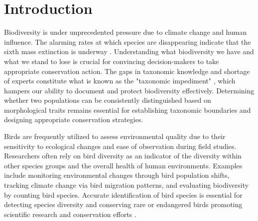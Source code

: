 \documentclass[a4paper,12pt]{report}
\begin{document}
\newpage
\tableofcontents

\newpage
\listoffigures

\newpage
\listoftables

\newpage
\cleardoublepage %
\setcounter{page}{1} %

\chapter{Introduction}

Biodiversity is under unprecedented pressure due to climate change and human influence. The alarming rates at which species are disappearing indicate that the sixth mass extinction is underway \citep{Ceballos2017}. Understanding what biodiversity we have and what we stand to lose is crucial for convincing decision-makers to take appropriate conservation action. The gaps in taxonomic knowledge and shortage of experts constitute what is known as the "taxonomic impediment" \citep{taxonomicimpediment}, which hampers our ability to document and protect biodiversity effectively. Determining whether two populations can be consistently distinguished based on morphological traits remains essential for establishing taxonomic boundaries and designing appropriate conservation strategies.

Birds are frequently utilized to assess environmental quality due to their sensitivity to ecological changes and ease of observation during field studies. Researchers often rely on bird diversity as an indicator of the diversity within other species groups and the overall health of human environments. Examples include monitoring environmental changes through bird population shifts, tracking climate change via bird migration patterns, and evaluating biodiversity by counting bird species. Accurate identification of bird species is essential for detecting species diversity and conserving rare or endangered birds promoting scientific research and conservation efforts \citep{ani13020264}.

\end{document}
